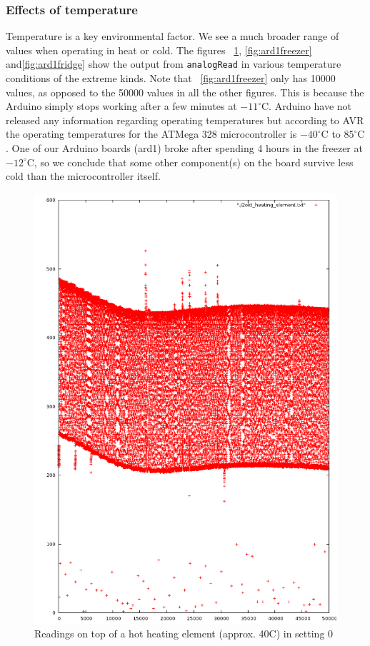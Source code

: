 \documentclass[a4paper]{article}           %
\begin{document}
\subsubsection{Effects of temperature}

Temperature is a key environmental factor. We see a much broader range of values when operating in heat or cold. The figures ~\ref{fig:ard1heat}, \ref{fig:ard1freezer} and\ref{fig:ard1fridge} show the output from \texttt{analogRead} in various temperature conditions of the extreme kinds. Note that ~\ref{fig:ard1freezer} only has 10000 values, as opposed to the 50000 values in all the other figures. This is because the Arduino simply stops working after a few minutes at $-11^\circ$C. Arduino have not released any information regarding operating temperatures but according to AVR the operating temperatures for the ATMega 328 microcontroller is $-40^\circ$C to $85^\circ$C \cite{atmegads}. One of our Arduino boards (ard1) broke after spending 4 hours in the freezer at $-12^\circ$C, so we conclude that some other component(s) on the board survive less cold than the microcontroller itself. 



\begin{figure}[H]
  \centering  
  \includegraphics[width=0.7\columnwidth]{img/Heating50k.png}
  \caption{Readings on top of a hot heating element (approx. 40C) in setting 0}
  \label{fig:ard1heat}
\end{figure}
\end{document}
